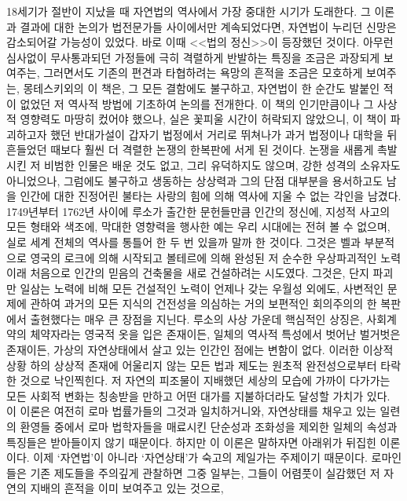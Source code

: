 18세기가 절반이 지났을 때 자연법의 역사에서 가장 중대한 시기가 도래한다.
그 이론과 결과에 대한 논의가 법전문가들 사이에서만 계속되었다면,
자연법이 누리던 신망은 감소되어갈 가능성이 있었다.
바로 이때 <<법의 정신>>이 등장했던 것이다.
아무런 심사없이 무사통과되던 가정들에 극히 격렬하게 반발하는
특징을 조금은 과장되게 보여주는,
그러면서도 기존의 편견과 타협하려는 욕망의 흔적을
조금은 모호하게 보여주는,
몽테스키외의 이 책은,
그 모든 결함에도 불구하고,
자연법이 한 순간도 발붙인 적이 없었던 저 역사적 방법에
기초하여 논의를 전개한다.
이 책의 인기만큼이나 그 사상적 영향력도 마땅히 컸어야 했으나,
실은 꽃피울 시간이 허락되지 않았으니,
이 책이 파괴하고자 했던 반대가설이 갑자기 법정에서 거리로 뛰쳐나가
과거 법정이나 대학을 뒤흔들었던 때보다 훨씬 더 격렬한 논쟁의
한복판에 서게 된 것이다.
논쟁을 새롭게 촉발시킨 저 비범한 인물은
배운 것도 없고, 그리 유덕하지도 않으며, 강한 성격의 소유자도 아니었으나,
그럼에도 불구하고 생동하는 상상력과
그의 단점 대부분을 용서하고도 남을
인간에 대한 진정어린 불타는 사랑의 힘에 의해
역사에 지울 수 없는 각인을 남겼다.
1749년부터 1762년 사이에 루소가 출간한 문헌들만큼
인간의 정신에, 지성적 사고의 모든 형태와 색조에,
막대한 영향력을 행사한 예는
우리 시대에는 전혀 볼 수 없으며, 실로 세계 전체의 역사를 통틀어 한 두 번
있을까 말까 한 것이다.
그것은 벨과
부분적으로 영국의 로크에 의해
시작되고 볼테르에 의해 완성된 저 순수한 우상파괴적인 노력 이래
처음으로 인간의 믿음의 건축물을 새로 건설하려는 시도였다.
그것은, 단지 파괴만 일삼는 노력에 비해 모든 건설적인 노력이
언제나 갖는 우월성 외에도,
사변적인 문제에 관하여 과거의 모든 지식의 건전성을 의심하는
거의 보편적인 회의주의의 한 복판에서 출현했다는 매우 큰 장점을 지닌다.
루소의 사상 가운데 핵심적인 상징은,
사회계약의 체약자라는 영국적 옷을 입은 존재이든,
일체의 역사적 특성에서 벗어난 벌거벗은 존재이든,
가상의 자연상태에서 살고 있는 인간인 점에는 변함이 없다.
이러한 이상적 상황 하의 상상적 존재에 어울리지 않는
모든 법과 제도는 원초적 완전성으로부터 타락한 것으로 낙인찍힌다.
저 자연의 피조물이 지배했던 세상의 모습에 가까이 다가가는 모든 사회적 변화는
칭송받을 만하고 어떤 대가를 지불하더라도 달성할 가치가 있다.
이 이론은 여전히 로마 법률가들의 그것과 일치하거니와,
자연상태를 채우고 있는 일련의 환영들 중에서
로마 법학자들을 매료시킨 단순성과 조화성을 제외한 일체의
속성과 특징들은 받아들이지 않기 때문이다.
하지만 이 이론은 말하자면 아래위가 뒤집힌 이론이다.
이제 `자연법'이 아니라 `자연상태'가 숙고의 제일가는 주제이기 때문이다.
로마인들은 기존 제도들을 주의깊게 관찰하면 그중 일부는,
그들이 어렴풋이 실감했던 저 자연의 지배의 흔적을 이미 보여주고 있는 것으로,
